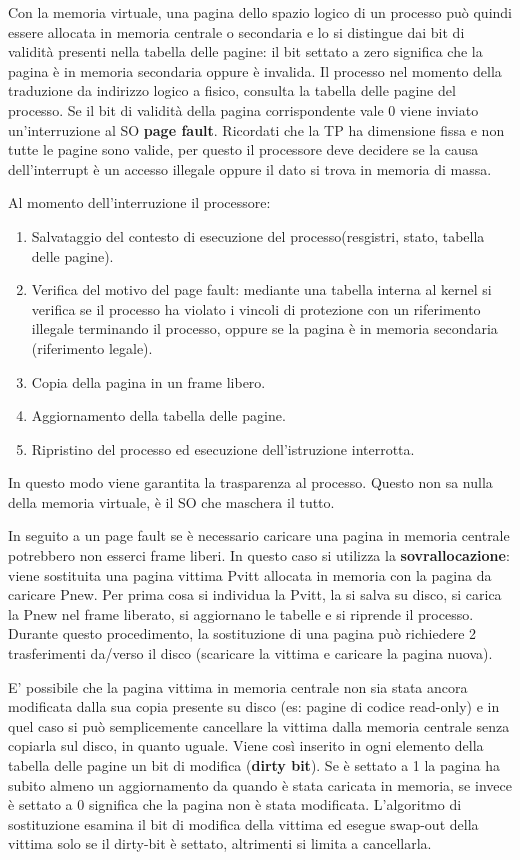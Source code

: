 \documentclass{article}
\begin{document}
\noindent Con la memoria virtuale, una pagina dello spazio logico di un processo può quindi essere allocata in memoria centrale o secondaria e lo si distingue dai bit 
di validità presenti nella tabella delle pagine: il bit settato a zero significa che la pagina è in memoria secondaria oppure è invalida.
Il processo nel momento della traduzione da indirizzo logico a fisico, consulta la tabella delle pagine del processo. Se il bit di validità della pagina corrispondente 
vale 0 viene inviato un'interruzione al SO \textbf{page fault}.
Ricordati che la TP ha dimensione fissa e non tutte le pagine sono valide, per questo il processore deve decidere se la causa dell'interrupt è un accesso illegale oppure
il dato si trova in memoria di massa.

\noindent Al momento dell'interruzione il processore:
\begin{enumerate}
    \item Salvataggio del contesto di esecuzione del processo(resgistri, stato, tabella delle pagine).
    \item Verifica del motivo del page fault: mediante una tabella interna al kernel si verifica se il
    processo ha violato i vincoli di protezione con un riferimento illegale terminando il processo, oppure se la pagina è in memoria secondaria (riferimento legale).
    \item Copia della pagina in un frame libero.
    \item Aggiornamento della tabella delle pagine.
    \item Ripristino del processo ed esecuzione dell'istruzione interrotta.
\end{enumerate}

\noindent In questo modo viene garantita la trasparenza al processo. Questo non sa nulla della memoria virtuale, è il SO che maschera il tutto.
\medskip

\noindent In seguito a un page fault se è necessario caricare una pagina in memoria centrale potrebbero non esserci frame liberi. In questo caso si utilizza la 
\textbf{sovrallocazione}: viene sostituita una pagina vittima Pvitt allocata in memoria con la pagina da caricare Pnew. Per prima cosa si individua la Pvitt,
la si salva su disco, si carica la Pnew nel frame liberato, si aggiornano le tabelle e si riprende il processo. Durante questo procedimento, la sostituzione di una pagina
 può richiedere 2 trasferimenti da/verso il disco (scaricare la vittima e caricare la pagina nuova).
 
 \noindent E' possibile che la pagina vittima in memoria centrale non sia stata ancora modificata dalla sua copia presente su disco (es: pagine di codice read-only) e in quel
  caso si può semplicemente cancellare la vittima dalla memoria centrale senza copiarla sul disco, in quanto uguale. Viene così inserito in ogni elemento della tabella delle
  pagine un bit di modifica (\textbf{dirty bit}). Se è settato a 1 la pagina ha subito almeno un aggiornamento da quando è stata caricata in memoria, se invece è settato a 0
  significa che la pagina non è stata modificata. L'algoritmo di sostituzione esamina il bit di modifica della vittima ed esegue swap-out della vittima solo se il dirty-bit
  è settato, altrimenti si limita a cancellarla.
  
\end{document}
